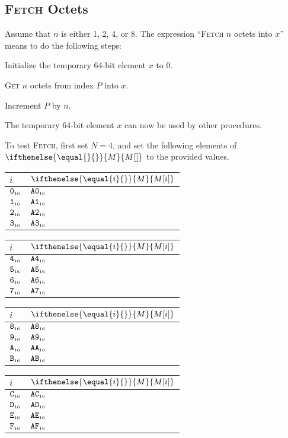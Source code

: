 \documentclass[a4paper,12pt]{article}
\makeatletter
\newcommand{\num}[1]{\texttt{#1}}
\newcommand{\hex}[1]{\num{#1}_{\textup{\tiny 16}}}
\newcommand{\MEM}[1]{\ifthenelse{\equal{#1}{}}{M}{M[#1]}}
\newcommand{\PC}{P}
\newcommand{\proc}[1]{\textsc{#1}}
\newenvironment{memtable}{%
  \begin{trivlist}
    \item
    }{%
    \end{trivlist}}
\newenvironment{memcolumn}{%
  \begin{tabular}{@{}ll@{}}
    $i$ & $\MEM{i}$ \\
    \hline}
    {%
    \hline
  \end{tabular}}
\newcommand{\memspace}{\qquad}
\makeatother
\begin{document}
\subsection{\proc{Fetch} Octets}

Assume that $n$ is either 1, 2, 4, or 8.
The expression ``\proc{Fetch} $n$ octets into $x$'' means to do the following steps:
\begin{stepnumbers}
\item Initialize the temporary 64-bit element $x$ to 0.
\item \proc{Get} $n$ octets from index $\PC$ into $x$.
\item Increment $\PC$ by $n$.
\end{stepnumbers}
The temporary 64-bit element $x$ can now be used by other procedures.

To test \proc{Fetch}, first set $N=4$, and set the following elements of $\MEM{}$ to the provided values.
\begin{memtable}
  \begin{memcolumn}
    $\hex{0}$ & $\hex{A0}$ \\
    $\hex{1}$ & $\hex{A1}$ \\
    $\hex{2}$ & $\hex{A2}$ \\
    $\hex{3}$ & $\hex{A3}$ \\
  \end{memcolumn}
  \memspace
  \begin{memcolumn}
    $\hex{4}$ & $\hex{A4}$ \\
    $\hex{5}$ & $\hex{A5}$ \\
    $\hex{6}$ & $\hex{A6}$ \\
    $\hex{7}$ & $\hex{A7}$ \\
  \end{memcolumn}
  \memspace
  \begin{memcolumn}
    $\hex{8}$ & $\hex{A8}$ \\
    $\hex{9}$ & $\hex{A9}$ \\
    $\hex{A}$ & $\hex{AA}$ \\
    $\hex{B}$ & $\hex{AB}$ \\
  \end{memcolumn}
  \memspace
  \begin{memcolumn}
    $\hex{C}$ & $\hex{AC}$ \\
    $\hex{D}$ & $\hex{AD}$ \\
    $\hex{E}$ & $\hex{AE}$ \\
    $\hex{F}$ & $\hex{AF}$ \\
  \end{memcolumn}
\end{memtable}
\end{document}
